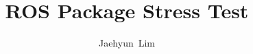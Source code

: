 \documentclass{beamer}
\title[ROS Package Stress Test] 
{%
  ROS Package Stress Test%
}
\author[Gramm] %
{
  Jaehyun~Lim\inst{1} %
}
\institute[JLim and others]
{
  \inst{1}%
  Machine Learning and Control Systems (MLCS) Laboratory\\
   \inst{1}School of Mechanical Engineering Yonsei University


}
\newcommand{\<}{\langle}
\theoremstyle{example}
\begin{document}
\begin{frame}
  \titlepage
\end{frame}



%
%
%
%
%
\end{document}
